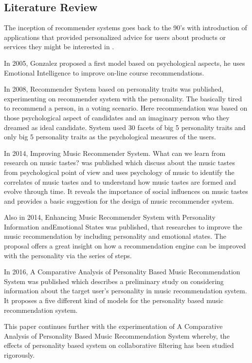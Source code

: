 \documentclass[journal]{IEEEtran}
\begin{document}
\subsection{Literature Review}
The inception of recommender systems goes back to the 90's with introduction of applications that provided personalized advice for users about products or services they might be interested in \cite{resnick}.

In 2005, Gonzalez \cite{gonzalez} proposed a first model based on psychological aspects, he uses Emotional Intelligence to improve on-line course recommendations.

In 2008, Recommender System based on personality traits \cite{nunes} was published, experimenting on recommender system with the personality. The basically tired to recommend a person, in a voting scenario. Here recommendation was based on those psychological aspect of candidates and an imaginary person who they dreamed as ideal candidate. System used 30 facets of big 5 personality traits and only big 5 personality traits as the psychological measures of the users.

In 2014, Improving Music Recommender System. What can we learn from research on music tastes? \cite{laplante} was published which discuss about the music tastes from psychological point of view and uses psychology of music to identify the correlates of music tastes and to understand how music tastes are formed and evolve through time. It reveals the importance of social influences on music tastes and provides a basic suggestion for the design of music recommender system.

Also in 2014, Enhancing Music Recommender System with Personality Information andEmotional States \cite{bruce} was published, that researches to improve the music recommendation by including personality and emotional states. The proposal offers a great insight on how a recommendation engine can be improved with the personality via the series of steps.

In 2016, A Comparative Analysis of Personality Based Music Recommendation System \cite{melissa} was published which describes a preliminary study on considering information about the target user's personality in music recommendation system. It proposes a five different kind of models for the personality based music recommendation system.

This paper continues further with the experimentation of A Comparative Analysis of Personality Based Music Recommendation System whereby, the effects of personality based system on collaborative filtering has been studied rigorously.
\end{document}
